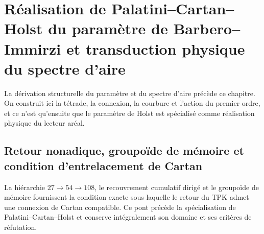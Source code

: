 \chapter{Réalisation de Palatini–Cartan–Holst du paramètre de Barbero–Immirzi et transduction physique du spectre d’aire}
\label{chap:parte-iv-68}

La dérivation structurelle du paramètre et du spectre d’aire précède ce chapitre. On construit ici la tétrade, la connexion, la courbure et l’action du premier ordre, et ce n’est qu’ensuite que le paramètre de Holst est spécialisé comme réalisation physique du lecteur aréal.



\section{Retour nonadique, groupoïde de mémoire et condition d’entrelacement de Cartan}

La hiérarchie \(27\to54\to108\), le recouvrement cumulatif dirigé et le groupoïde de mémoire fournissent la condition exacte sous laquelle le retour du TPK admet une connexion de Cartan compatible. Ce pont précède la spécialisation de Palatini--Cartan--Holst et conserve intégralement son domaine et ses critères de réfutation.

\begingroup
\let\chapter\section
\let\section\subsection
\let\subsection\subsubsection
\let\subsubsection\paragraph
\let\clearpage\relax
\let\cleardoublepage\relax

\endgroup

